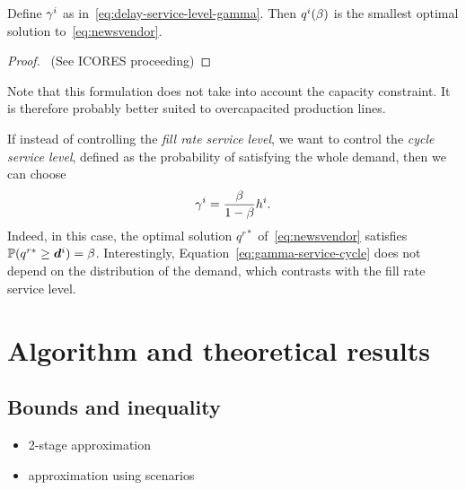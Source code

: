 \begin{prop}\label{prop:vendor}
Define $\gamma^i$ as in~\eqref{eq:delay-service-level-gamma}. Then $q^i(\beta)$ is the smallest optimal solution to~\eqref{eq:newsvendor}.
\end{prop}

\begin{proof}
\tbc~(See ICORES proceeding)
\end{proof}

Note that this formulation does not take into account the capacity constraint. It is therefore probably better suited to overcapacited production lines.

\begin{rmq}
If instead of controlling the {\em fill rate service level}, we want to control the {\em cycle service level}, defined as the probability of satisfying the whole demand, then we can choose
\begin{equation}
\label{eq:gamma-service-cycle}
\gamma^i = \frac{\beta}{1-\beta} h^i.
\end{equation}
Indeed, in this case, the optimal solution $q^{r*}$ of~\eqref{eq:newsvendor} satisfies $\PP(q^{r*} \geq \va d^i) = \servicelvl$. Interestingly, Equation~\eqref{eq:gamma-service-cycle} does not depend on the distribution of the demand, which contrasts with the fill rate service level.
\end{rmq}







\section{Algorithm and theoretical results}

\subsection{Bounds and inequality}

\begin{itemize}
  \item 2-stage approximation
  \item approximation using scenarios
\end{itemize}

